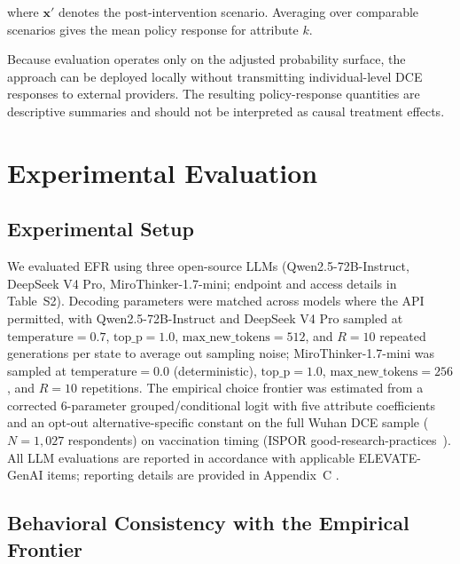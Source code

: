 \documentclass[12pt]{article}
\begin{document}
where $\mathbf{x}'$ denotes the post-intervention scenario. Averaging over comparable scenarios gives the mean policy response for attribute $k$.

Because evaluation operates only on the adjusted probability surface, the approach can be deployed locally without transmitting individual-level DCE responses to external providers. The resulting policy-response quantities are descriptive summaries and should not be interpreted as causal treatment effects.



\clearpage

\clearpage
\section{Experimental Evaluation}

\subsection{Experimental Setup}
\label{sec:setup}

We evaluated EFR using three open-source LLMs (Qwen2.5-72B-Instruct, DeepSeek V4 Pro, MiroThinker-1.7-mini; endpoint and access details in Table~S2). Decoding parameters were matched across models where the API permitted, with Qwen2.5-72B-Instruct and DeepSeek V4 Pro sampled at $\mathrm{temperature}=0.7$, $\mathrm{top\_p}=1.0$, $\mathrm{max\_new\_tokens}=512$, and $R=10$ repeated generations per state to average out sampling noise; MiroThinker-1.7-mini was sampled at $\mathrm{temperature}=0.0$ (deterministic), $\mathrm{top\_p}=1.0$, $\mathrm{max\_new\_tokens}=256$, and $R=10$ repetitions. The empirical choice frontier was estimated from a corrected 6-parameter grouped/conditional logit with five attribute coefficients and an opt-out alternative-specific constant on the full Wuhan DCE sample ($N=1{,}027$ respondents) on vaccination timing (ISPOR good-research-practices~\citep{Johnson2013DCE,Hauber2016DCE}). All LLM evaluations are reported in accordance with applicable ELEVATE-GenAI items; reporting details are provided in Appendix~C \citep{Fleurence2025}.

\subsection{Behavioral Consistency with the Empirical Frontier}
\label{sec:behavioral_consistency}
\end{document}
